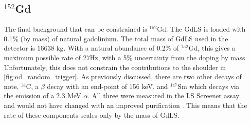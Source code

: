 






\subsection{${}^{152}$Gd}
\par
The final background that can be constrained is ${}^{152}$Gd.
The GdLS is loaded with 0.1\% (by mass) of natural gadolinium.
The total mass of GdLS used in the detector is 16638 kg.
With a natural abundance of 0.2\% of ${}^{152}$Gd, this gives a maximum possible rate of 27Hz, with a 5\% uncertainty from the doping by mass.
Unfortunately, this does not constrain the contributions to the shoulder in \autoref{fig:od_random_trigger}.
As previously discussed, there are two other decays of note, ${}^{14}$C, a $\beta$ decay with an end-point of 156 keV, and ${}^{147}$Sm which decays via the emission of a 2.3 MeV $\alpha$.
All three were measured in the LS Screener assay and would not have changed with an improved purification \cite{scotthaselschwardt_thesis_ref}.
This means that the rate of these components scales only by the mass of GdLS.


